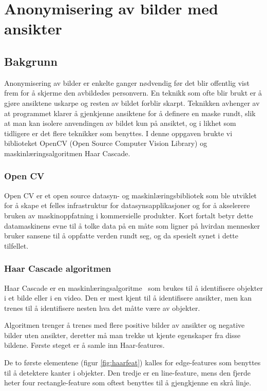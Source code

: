 \newpage
\section{Anonymisering av bilder med ansikter}
\label{sec:Anonymisering}
\subsection{Bakgrunn}
Anonymisering av bilder er enkelte ganger nødvendig før det blir offentlig vist frem for å skjerme den avbildedes personvern. En teknikk som ofte blir brukt er å gjøre ansiktene uskarpe og resten av bildet forblir skarpt. Teknikken avhenger av at programmet klarer å gjenkjenne ansiktene\cite{wiki:FaceDetection} for å definere en maske rundt, slik at man kan isolere anvendingen av bildet kun på ansiktet, og i likhet som tidligere er det flere teknikker som benyttes. I denne oppgaven brukte vi biblioteket OpenCV (Open Source Computer Vision Library) og maskinlæringsalgoritmen Haar Cascade. 



\subsubsection{Open CV}
Open CV er et open source datasyn-\cite{datasyn} og maskinlæringsbibliotek som ble utviklet for å skape et felles infrastruktur for datasynsapplikasjoner og for å akselerere bruken av maskinoppfatning i kommersielle produkter\cite{cv2}. Kort fortalt betyr dette datamaskinens evne til å tolke data på en måte som ligner på hvirdan mennesker bruker sansene til å oppfatte verden rundt seg\cite{wiki:machinePerception}, og da spesielt synet i dette tilfellet.  

\subsubsection{Haar Cascade algoritmen}
Haar Cascade er en maskinlæringsalgoritme~\cite{haar} som brukes til å identifisere objekter i et bilde eller i en video. Den er mest kjent til å identifisere ansikter, men kan trenes til å identifisere nesten hva det måtte være av objekter.

Algoritmen trenger å trenes med flere positive bilder av ansikter og negative bilder uten ansikter, deretter må man trekke ut kjente egenskaper fra disse bildene. Første steget er å samle inn Haar-features. 

De to første elementene (figur \ref{fig:haarfeat}) kalles for edge-features som benyttes til å detektere kanter i objekter. Den tredje er en line-feature, mens den fjerde heter four rectangle-feature som oftest benyttes til å gjengkjenne en skrå linje.

